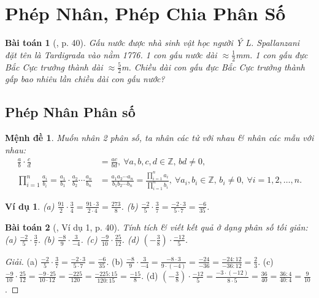 \documentclass{article}
\newtheorem{baitoan}{Bài toán}
\newtheorem{menhde}{Mệnh đề}
\newtheorem{vidu}{Ví dụ}
\begin{document}

\section{Phép Nhân, Phép Chia Phân Số}

\begin{baitoan}[\cite{SGK_Toan_6_Canh_Dieu_tap_2}, p. 40]
	Gấu nước được nhà sinh vật học người Ý L. Spallanzani đặt tên là Tardigrada vào nằm 1776. 1 con gấu nước dài $\approx\frac{1}{2}$\emph{mm}. 1 con gấu đực Bắc Cực trưởng thành dài $\approx\frac{5}{2}$\emph{m}. Chiều dài con gấu đực Bắc Cực trưởng thành gấp bao nhiêu lần chiều dài con gấu nước?
\end{baitoan}

\subsection{Phép Nhân Phân số}

\begin{menhde}
	Muốn nhân 2 phân số, ta nhân các tử với nhau \& nhân các mẫu với nhau:
	\begin{align*}
		\frac{a}{b}\cdot\frac{c}{d} &= \frac{ac}{bd},\ \forall a,b,c,d\in\mathbb{Z},\,bd\ne0,\\
		\prod_{i=1}^n \frac{a_i}{b_i} = \frac{a_1}{b_1}\cdot\frac{a_2}{b_2}\cdots\frac{a_n}{b_n} &= \frac{a_1a_2\cdots a_n}{b_1b_2\cdots b_n} = \frac{\prod_{i=1}^n a_i}{\prod_{i=1}^n b_i},\ \forall a_i,b_i\in\mathbb{Z},\,b_i\ne0,\ \forall i = 1,2,\ldots,n.
	\end{align*}
\end{menhde}

\begin{vidu}
	(a) $\frac{91}{2}\cdot\frac{3}{4} = \frac{91\cdot3}{2\cdot4} = \frac{273}{8}$. (b) $\frac{-2}{5}\cdot\frac{3}{7} = \frac{-2\cdot3}{5\cdot7} = \frac{-6}{35}$.
\end{vidu}

\begin{baitoan}[\cite{SGK_Toan_6_Canh_Dieu_tap_2}, Ví dụ 1, p. 40]
	Tính tích \& viết kết quả ở dạng phân số tối giản: (a) $\frac{-2}{5}\cdot\frac{3}{7}$. (b) $\frac{-8}{9}\cdot\frac{3}{-4}$. (c) $\frac{-9}{10}\cdot\frac{25}{12}$. (d) $\left(-\frac{3}{8}\right)\cdot\frac{-12}{5}$.
\end{baitoan}

\begin{proof}[Giải]
	(a) $\frac{-2}{5}\cdot\frac{3}{7} = \frac{-2\cdot3}{5\cdot7} = \frac{-6}{35}$. (b) $\frac{-8}{9}\cdot\frac{3}{-4} = \frac{-8\cdot3}{9\cdot(-4)} = \frac{-24}{-36} = \frac{-24:12}{-36:12} = \frac{2}{3}$. (c) $\frac{-9}{10}\cdot\frac{25}{12} = \frac{-9\cdot25}{10\cdot12} = \frac{-225}{120} = \frac{-225:15}{120:15} = \frac{-15}{8}$. (d) $\left(-\frac{3}{8}\right)\cdot\frac{-12}{5} = \frac{-3\cdot(-12)}{8\cdot5} = \frac{36}{40} = \frac{36:4}{40:4} = \frac{9}{10}$.
\end{proof}
\end{document}
